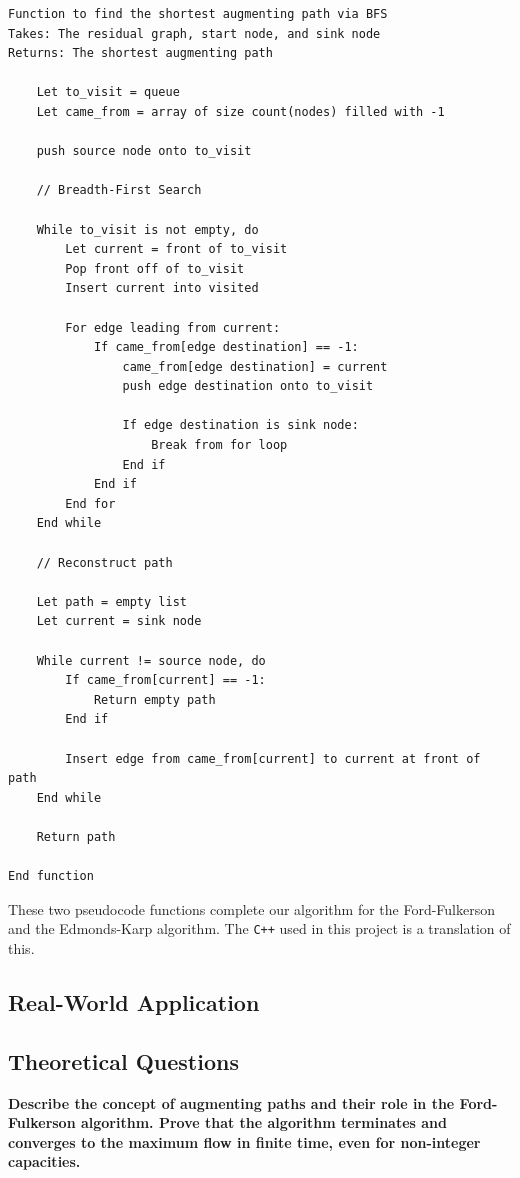 \documentclass[12pt]{amsart}
\begin{document}
\begin{verbatim}
Function to find the shortest augmenting path via BFS
Takes: The residual graph, start node, and sink node
Returns: The shortest augmenting path

    Let to_visit = queue
    Let came_from = array of size count(nodes) filled with -1

    push source node onto to_visit

    // Breadth-First Search

    While to_visit is not empty, do
        Let current = front of to_visit
        Pop front off of to_visit
        Insert current into visited

        For edge leading from current:
            If came_from[edge destination] == -1:
                came_from[edge destination] = current
                push edge destination onto to_visit

                If edge destination is sink node:
                    Break from for loop
                End if
            End if
        End for
    End while

    // Reconstruct path

    Let path = empty list
    Let current = sink node

    While current != source node, do
        If came_from[current] == -1:
            Return empty path
        End if

        Insert edge from came_from[current] to current at front of path
    End while

    Return path

End function

\end{verbatim}

    These two pseudocode functions complete our algorithm for
    the Ford-Fulkerson and the Edmonds-Karp algorithm. The
    \verb|C++| used in this project is a translation of this.

\subsection{Real-World Application}


\subsection{Theoretical Questions}

    \textbf{Describe the concept of augmenting paths and
    their role in the Ford-Fulkerson algorithm. Prove that the
    algorithm terminates and converges to the maximum flow in
    finite time, even for non-integer capacities.}
\end{document}

